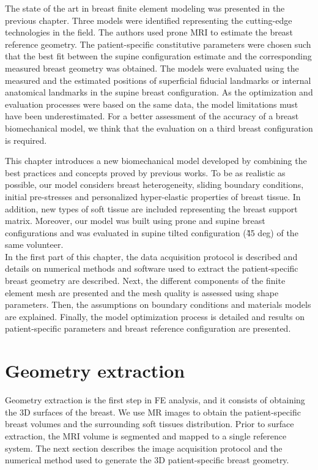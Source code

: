 
The state of the art in breast finite element modeling was presented in the previous chapter. Three models were identified representing the cutting-edge technologies in the field. The authors used prone MRI to estimate the breast reference geometry. The patient-specific constitutive parameters were chosen such that the best fit between the supine configuration estimate and the corresponding measured breast geometry was obtained. The models were evaluated using the measured and the estimated positions of superficial fiducial landmarks or internal anatomical landmarks in the supine breast configuration. As the optimization and evaluation  processes were based on the same data, the model limitations must have been underestimated. For a better assessment of the accuracy of a breast biomechanical model, we think that the evaluation on a third breast configuration is required.

 This chapter introduces a new biomechanical model developed by combining the best practices and concepts proved by previous works. To be as realistic as possible, our model considers breast heterogeneity, sliding boundary conditions, initial pre-stresses and personalized hyper-elastic properties of breast tissue. In addition, new types of soft tissue are included representing the breast support matrix. Moreover, our model was built using prone and supine breast configurations and was evaluated in supine tilted configuration (\~ 45 deg) of the same volunteer.\\
 

In the first part of this chapter, the data acquisition protocol is described and details on numerical methods and software used to extract the patient-specific breast geometry are described. Next, the different components of the finite element mesh are presented and the mesh quality is assessed using shape parameters.  Then, the assumptions on boundary conditions and materials models are explained. Finally, the model optimization process is detailed and results on patient-specific parameters and breast reference configuration are presented.   
\clearpage
\section{Geometry extraction}\label{section:geometryextraction}

Geometry extraction is the first step in FE analysis, and it consists of obtaining the 3D surfaces of the
breast. We use MR images to obtain the patient-specific breast volumes and the surrounding soft tissues distribution. Prior to surface extraction, the MRI volume is segmented and mapped to a single reference system. The next section describes the image acquisition protocol and the numerical method used to generate the 3D patient-specific breast geometry.

